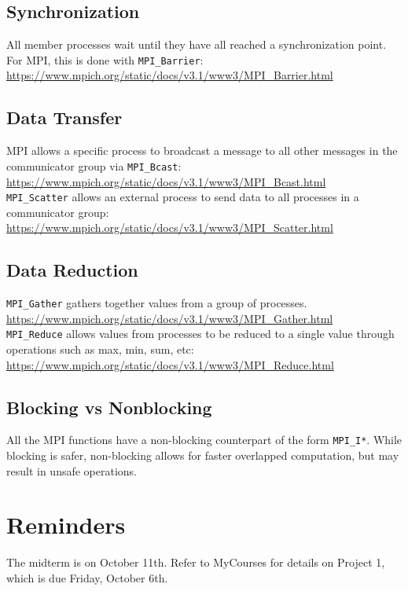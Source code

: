 \documentclass[letterpaper, 12pt]{math}
\begin{document}
\subsection*{Synchronization}
All member processes wait until they have all reached a synchronization point.
For MPI, this is done with \texttt{MPI\_Barrier}: \\
\url{https://www.mpich.org/static/docs/v3.1/www3/MPI_Barrier.html}

\subsection*{Data Transfer}
MPI allows a specific process to broadcast a message to all other messages in
the communicator group via \texttt{MPI\_Bcast}: \\
\url{https://www.mpich.org/static/docs/v3.1/www3/MPI_Bcast.html} \\
\texttt{MPI\_Scatter} allows an external process to send data to all processes
in a communicator group: \\
\url{https://www.mpich.org/static/docs/v3.1/www3/MPI_Scatter.html}

\subsection*{Data Reduction}
\texttt{MPI\_Gather} gathers together values from a group of processes. \\
\url{https://www.mpich.org/static/docs/v3.1/www3/MPI_Gather.html} \\
\texttt{MPI\_Reduce} allows values from processes to be reduced to a single
value through operations such as max, min, sum, etc: \\
\url{https://www.mpich.org/static/docs/v3.1/www3/MPI_Reduce.html}

\subsection*{Blocking vs Nonblocking}
All the MPI functions have a non-blocking counterpart of the form
\texttt{MPI\_I*}. While blocking is safer, non-blocking allows for faster
overlapped computation, but may result in unsafe operations.

\section*{Reminders}
The midterm is on October 11th.
Refer to MyCourses for details on Project 1, which is due Friday,
October 6th. \\
\end{document}
